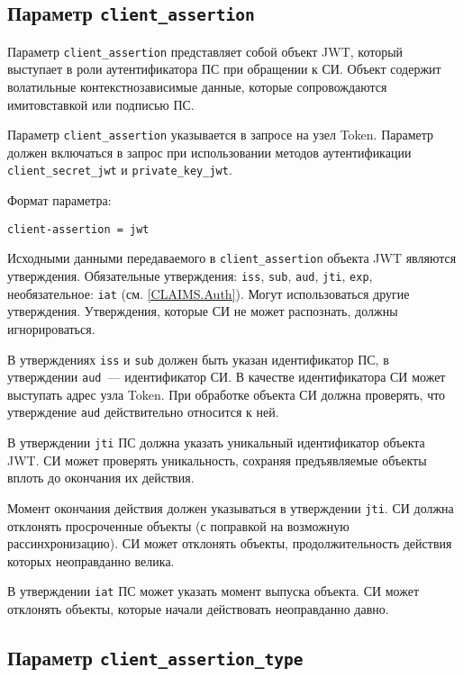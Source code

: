 \subsection{Параметр \lstinline{client_assertion}}
\label{PARAMS.ClientAssertion}

Параметр \lstinline{client_assertion} представляет собой объект JWT, 
который выступает в роли аутентификатора ПС при обращении к СИ.
%
Объект содержит волатильные контекстнозависимые данные, которые сопровождаются 
имитовставкой или подписью ПС. 

Параметр \lstinline{client_assertion} указывается в запросе на узел Token.
%
Параметр должен включаться в запрос при использовании методов аутентификации 
\lstinline{client_secret_jwt} и \lstinline{private_key_jwt}.

Формат параметра:
\begin{lstlisting}
client-assertion = jwt
\end{lstlisting}

Исходными данными передаваемого в \lstinline{client_assertion} объекта JWT 
являются утверждения. Обязательные утверждения:
\lstinline{iss}, \lstinline{sub}, \lstinline{aud}, \lstinline{jti}, 
\lstinline{exp}, 
необязательное: \lstinline{iat} (см. \ref{CLAIMS.Auth}).
%
Могут использоваться другие утверждения. Утверждения, которые СИ не может 
распознать, должны игнорироваться.

В утверждениях \lstinline{iss} и \lstinline{sub} должен быть указан
идентификатор ПС, в утверждении \lstinline{aud}~--- идентификатор СИ.
В качестве идентификатора СИ может выступать адрес узла Token. При обработке 
объекта СИ должна проверять, что утверждение \lstinline{aud} действительно 
относится к ней.

В утверждении \lstinline{jti} ПС должна указать уникальный идентификатор 
объекта JWT. СИ может проверять уникальность, сохраняя предъявляемые объекты 
вплоть до окончания их действия.

Момент окончания действия должен указываться в утверждении \lstinline{jti}. 
СИ должна отклонять просроченные объекты (с поправкой на возможную 
рассинхронизацию). 
%
СИ может отклонять объекты, продолжительность действия которых неоправданно 
велика.

В утверждении \lstinline{iat} ПС может указать момент выпуска объекта. 
%
СИ может отклонять объекты, которые начали действовать неоправданно 
давно.

\subsection{Параметр \lstinline{client_assertion_type}}
\label{PARAMS.ClientAssertionType} 

